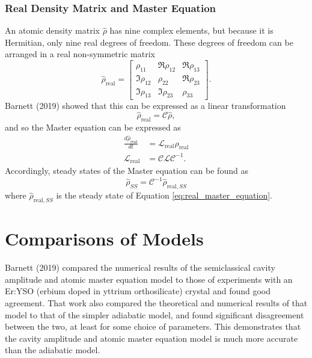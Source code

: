 \subsubsection{Real Density Matrix and Master Equation}
An atomic density matrix $\hat{\rho}$ has nine complex elements, but because it is Hermitian, only nine real degrees of freedom. These degrees of freedom can be arranged in a real non-symmetric matrix
\begin{equation}
    \hat{\rho}_\text{real} =
    \begin{bmatrix}
        \rho_{11} & \Re\rho_{12} & \Re\rho_{13}\\
        \Im\rho_{12} & \rho_{22} & \Re\rho_{23}\\
        \Im\rho_{13} & \Im\rho_{23} & \rho_{33}
    \end{bmatrix}.
    \label{eq:real_density_matrix}
\end{equation}
Barnett (2019) \cite{barnett_msc} showed that this can be expressed as a linear transformation
\begin{equation}
    \hat{\rho}_\text{real} = \mathcal{C}\hat{\rho},
\end{equation}
and so the Master equation can be expressed as
\begin{equation}
\begin{split}
    \frac{d\hat{\rho}_\text{real}}{dt} &= \mathcal{L}_\text{real} \hat{\rho}_\text{real}\\
    \mathcal{L}_\text{real} &= \mathcal{C} \mathcal{L} \mathcal{C}^{-1}.
\end{split}
\label{eq:real_master_equation}
\end{equation}
Accordingly, steady states of the Master equation can be found as
\begin{equation}
    \hat{\rho}_{SS} = \mathcal{C}^{-1}\hat{\rho}_{\text{real},SS}
\end{equation}
where $\hat{\rho}_{\text{real},SS}$ is the steady state of Equation \ref{eq:real_master_equation}.

\section{Comparisons of Models}
Barnett (2019) \cite{barnett_msc} compared the numerical results of the semiclassical cavity amplitude and atomic master equation model to those of experiments with an Er:YSO (erbium doped in yttrium orthosilicate) crystal and found good agreement. That work also compared the theoretical and numerical results of that model to that of the simpler adiabatic model, and found significant disagreement between the two, at least for some choice of parameters. This demonstrates that the cavity amplitude and atomic master equation model is much more accurate than the adiabatic model.

